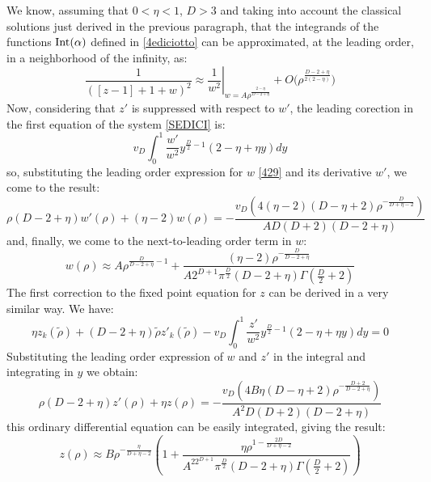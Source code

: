We know, assuming that $0<\eta<1$, $D>3$ and taking into account the classical solutions just derived in the previous paragraph, that the integrands
of the functions $\operatorname{Int}(\alpha)$ defined in \eqref{4ediciotto} can be approximated, at the leading order, in a neighborhood of the infinity, as:
\begin{equation}
\frac{1}{([z-1]+1+w)^2} \approx \left.\frac{1}{w^2}\right|_{w = A{\rho}^\frac{2 - \eta}{D - 2 + \eta}} + O\big(\rho^{\frac{D-2+\eta}{2(2-\eta)}}\big)
\end{equation}
Now, considering that $z'$ is suppressed with respect to $w'$, the leading corection in the first equation of the system \eqref{SEDICI} is:
\begin{equation}
 v_D\int_0^1 \frac{w'}{w^2} y^{\frac{D}{2}-1} (2-\eta +\eta  y)dy
\end{equation}
so, substituting the leading order expression for $w$ \eqref{429} and its derivative $w'$, we come to the result:
\begin{equation}
 \rho  (D-2 +\eta) w'(\rho )+(\eta -2) w(\rho )=-\frac{v_D \left(4 (\eta -2) (D-\eta +2) \rho ^{-\frac{D}{D+\eta -2}}\right)}{A D (D+2) (D -2 +\eta )}
\end{equation}
and, finally, we come to the next-to-leading order term in $w$:
\begin{equation}
 w(\rho) \approx A \rho ^{\frac{D}{D-2 +\eta}-1}+\frac{ (\eta -2) \rho ^{-\frac{D}{D-2+\eta}}}{A 2^{D+1} \pi ^{\frac{D}{2}}(D-2+\eta) \Gamma \left(\frac{D}{2}+2\right)}
\end{equation}
The first correction to the fixed point equation for $z$ can be derived in a very similar way. We have:
\begin{equation}
 \eta z_k(\widetilde{\rho}) + (D-2+\eta)\widetilde{\rho}z'_k(\widetilde{\rho})  -v_D\int_0^1 \frac{z'}{w^2} y^{\frac{D}{2}-1} (2-\eta +\eta  y)dy = 0
\end{equation}
Substituting the leading order expression of $w$ and $z'$ in the integral and integrating in $y$ we obtain:
\begin{equation}
 \rho  (D -2+\eta) z'(\rho )+\eta  z(\rho )= -\frac{v_D \left(4 B \eta  (D-\eta +2) \rho ^{-\frac{D+2}{D -2+\eta}}\right)}{A^2 D (D+2) (D-2+\eta)}
\end{equation}
this ordinary differential equation can be easily integrated, giving the result:
\begin{equation}
 z(\rho) \approx  B \rho ^{-\frac{\eta }{D+\eta -2}} \left(1+\frac{ \eta  \rho ^{1-\frac{2D}{D+\eta -2}}}{A^22^{D+1} \pi ^{\frac{D}{2}}(D -2+\eta) \Gamma \left(\frac{D}{2}+2\right)}\right)
\end{equation}

